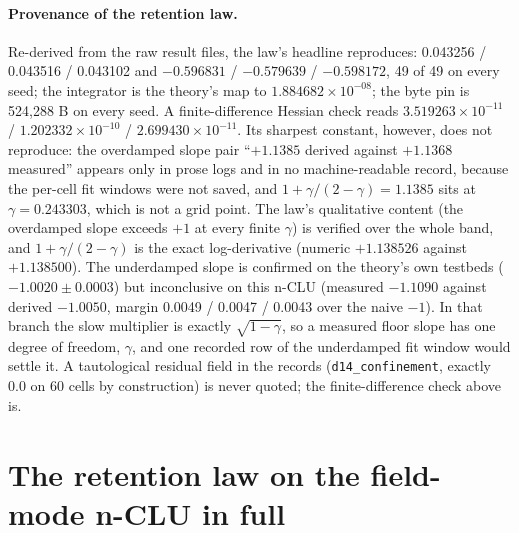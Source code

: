 \documentclass{article} %
\newcommand{\sci}[2]{\ensuremath{#1\times10^{#2}}}
\begin{document}
\paragraph{Provenance of the retention law.} Re-derived from the raw result files, the law's
headline reproduces: 0.043256 / 0.043516 / 0.043102 and $-0.596831$ / $-0.579639$ / $-0.598172$,
49 of 49 on every seed; the integrator is the theory's map to \sci{1.884682}{-08}; the byte pin is
524,288 B on every seed. A finite-difference Hessian check reads \sci{3.519263}{-11} /
\sci{1.202332}{-10} / \sci{2.699430}{-11}. %
Its sharpest constant, however, does not reproduce: the overdamped slope pair ``$+1.1385$ derived
against $+1.1368$ measured'' appears only in prose logs and in no machine-readable record,
because the per-cell fit windows were not saved, and $1+\gamma/(2-\gamma)=1.1385$ sits at
$\gamma=0.243303$, which is not a grid point. The law's qualitative content (the overdamped slope
exceeds $+1$ at every finite $\gamma$) is verified over the whole band, and $1+\gamma/(2-\gamma)$ is
the exact log-derivative (numeric $+1.138526$ against $+1.138500$). The underdamped slope is
confirmed on the theory's own testbeds ($-1.0020\pm0.0003$) but inconclusive on this n-CLU (measured
$-1.1090$ against derived $-1.0050$, margin 0.0049 / 0.0047 / 0.0043 over the naive $-1$). In that
branch the slow multiplier is exactly $\sqrt{1-\gamma}$, so a measured floor slope has one degree of
freedom, $\gamma$, and one recorded row of the underdamped fit window would settle it. A tautological
residual field in the records (\texttt{d14\_confinement}, exactly 0.0 on 60 cells by construction)
is never quoted; the finite-difference check above is. %

\section{The retention law on the field-mode n-CLU in full}
\label{app:physics}
\end{document}
